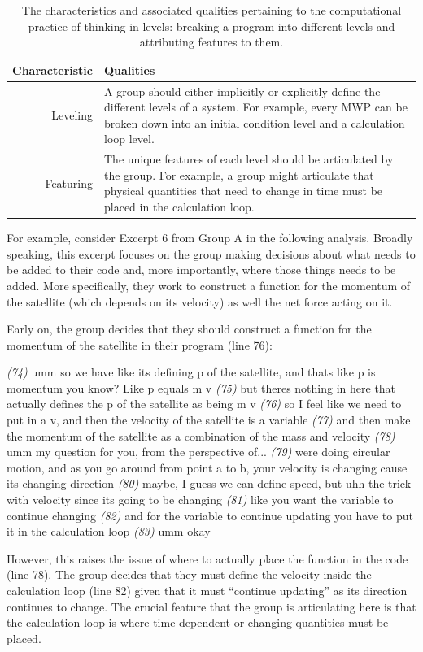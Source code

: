 \documentclass{msuphddissertation}
\begin{document}
\begin{doublespace}
\begin{table}
\begin{tabular}{r|p{}}
Characteristic & Qualities \\\hline\hline
Leveling & A group should either implicitly or explicitly define the different levels of a system.  For example, every MWP can be broken down into an initial condition level and a calculation loop level.\\
Featuring & The unique features of each level should be articulated by the group.  For example, a group might articulate that physical quantities that need to change in time must be placed in the calculation loop.\\
\end{tabular}\caption{The characteristics and associated qualities pertaining to the computational practice of thinking in levels: breaking a program into different levels and attributing features to them.}\label{CH5:ThinkingInLevels}
\end{table}

For example, consider Excerpt 6 from Group A in the following analysis.  Broadly speaking, this excerpt focuses on the group making decisions about what needs to be added to their code and, more importantly, where those things needs to be added.  More specifically, they work to construct a function for the momentum of the satellite (which depends on its velocity) as well the net force acting on it.

Early on, the group decides that they should construct a function for the momentum of the satellite in their program (line 76): \begin{description}
\SC \textit{(74)} umm so we have like its defining p of the satellite, and thats like p is momentum you know? Like p equals m v 
\SC \textit{(75)} but theres nothing in here that actually defines the p of the satellite as being m v  
\SC \textit{(76)} so I feel like we need to put in a v, and then the velocity of the satellite is a variable  
\SC \textit{(77)} and then make the momentum of the satellite as a combination of the mass and velocity 
\SB \textit{(78)} umm my question for you, from the perspective of...
\SB \textit{(79)} were doing circular motion, and as you go around from point a to b, your velocity is changing cause its changing direction    
\SB \textit{(80)} maybe, I guess we can define speed, but uhh the trick with velocity since its going to be changing
\SB \textit{(81)} like you want the variable to continue changing   
\SB \textit{(82)} and for the variable to continue updating you have to put it in the calculation loop    
\SC \textit{(83)} umm okay 
\end{description}  However, this raises the issue of where to actually place the function in the code (line 78).  The group decides that they must define the velocity inside the calculation loop (line 82) given that it must ``continue updating'' as its direction continues to change.  The crucial feature that the group is articulating here is that the calculation loop is where time-dependent or changing quantities must be placed.


\end{doublespace}
\end{document}
